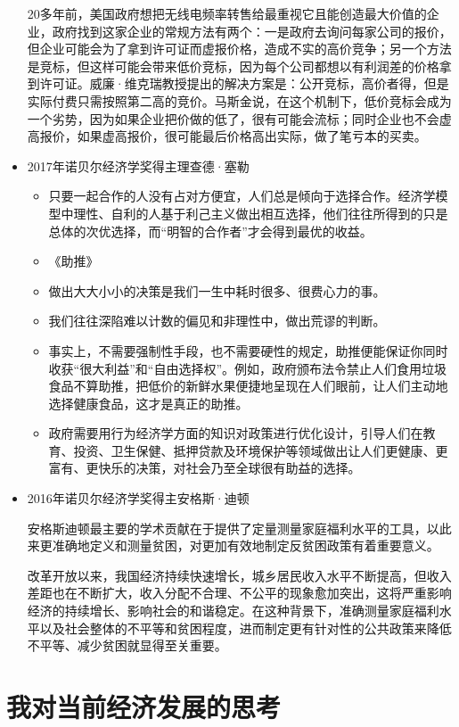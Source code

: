 \documentclass[UTF9]{ctexart}
\begin{document}
\begin{itemize}
20多年前，美国政府想把无线电频率转售给最重视它且能创造最大价值的企业，政府找到这家企业的常规方法有两个：一是政府去询问每家公司的报价，但企业可能会为了拿到许可证而虚报价格，造成不实的高价竞争；另一个方法是竞标，但这样可能会带来低价竞标，因为每个公司都想以有利润差的价格拿到许可证。威廉·维克瑞教授提出的解决方案是：公开竞标，高价者得，但是实际付费只需按照第二高的竞价。马斯金说，在这个机制下，低价竞标会成为一个劣势，因为如果企业把价做的低了，很有可能会流标；同时企业也不会虚高报价，如果虚高报价，很可能最后价格高出实际，做了笔亏本的买卖。

\item 2017年诺贝尔经济学奖得主理查德·塞勒

\begin{itemize}
\item 只要一起合作的人没有占对方便宜，人们总是倾向于选择合作。经济学模型中理性、自利的人基于利己主义做出相互选择，他们往往所得到的只是总体的次优选择，而“明智的合作者”才会得到最优的收益。
\item 《助推》
\item 做出大大小小的决策是我们一生中耗时很多、很费心力的事。
\item 我们往往深陷难以计数的偏见和非理性中，做出荒谬的判断。
\item 事实上，不需要强制性手段，也不需要硬性的规定，助推便能保证你同时收获“很大利益”和“自由选择权”。例如，政府颁布法令禁止人们食用垃圾食品不算助推，把低价的新鲜水果便捷地呈现在人们眼前，让人们主动地选择健康食品，这才是真正的助推。
\item 政府需要用行为经济学方面的知识对政策进行优化设计，引导人们在教育、投资、卫生保健、抵押贷款及环境保护等领域做出让人们更健康、更富有、更快乐的决策，对社会乃至全球很有助益的选择。
\end{itemize}

\item 2016年诺贝尔经济学奖得主安格斯·迪顿

安格斯迪顿最主要的学术贡献在于提供了定量测量家庭福利水平的工具，以此来更准确地定义和测量贫困，对更加有效地制定反贫困政策有着重要意义。

改革开放以来，我国经济持续快速增长，城乡居民收入水平不断提高，但收入差距也在不断扩大，收入分配不合理、不公平的现象愈加突出，这将严重影响经济的持续增长、影响社会的和谐稳定。在这种背景下，准确测量家庭福利水平以及社会整体的不平等和贫困程度，进而制定更有针对性的公共政策来降低不平等、减少贫困就显得至关重要。

\end{itemize}

\section{我对当前经济发展的思考}
\end{document}
